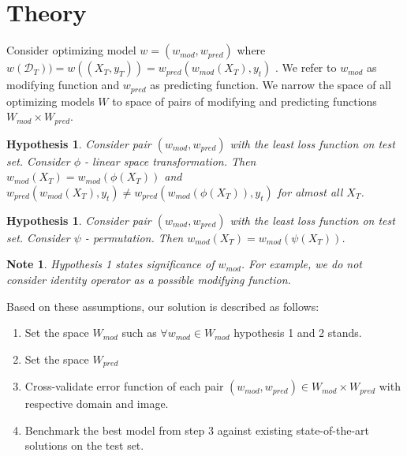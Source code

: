 \section{Theory}
Consider optimizing model $w = (w_{mod}, w_{pred})$ where $w(\mathcal{D}_T)) = w((X_T, y_T)) = w_{pred}(w_{mod}(X_T), y_t)$
. We refer to $w_{mod}$ as modifying function and $w_{pred}$ as predicting function. 
We narrow the space of all optimizing models $W$ to space of pairs of modifying and predicting functions $W_{mod} \times W_{pred}$.
\newtheorem{hypothesis}{Hypothesis}
\begin{hypothesis}
Consider pair $(w_{mod}, w_{pred})$ with the least loss function on test set. Consider $\phi$ - linear space transformation. Then $w_{mod}(X_T) = w_{mod}(\phi(X_T))$ and $w_{pred}(w_{mod}(X_T), y_t) \neq w_{pred}(w_{mod}(\phi(X_T)), y_t)$ for almost all $X_T$.
\end{hypothesis}

\newtheorem{hypothesis}{Hypothesis}
\begin{hypothesis}
Consider pair $(w_{mod}, w_{pred})$ with the least loss function on test set. Consider $\psi$ - permutation. Then $w_{mod}(X_T) = w_{mod}(\psi(X_T))$.
\end{hypothesis}

\newtheorem{note}{Note}
\begin{note}
Hypothesis 1 states significance of $w_{mod}$. For example, we do not consider identity operator as a possible modifying function.
\end{note}

Based on these assumptions, our solution is described as follows:
\begin{enumerate}
    \item Set the space $W_{mod}$ such as $\forall w_{mod} \in W_{mod}$ hypothesis 1 and 2 stands.
    \item Set the space $W_{pred}$
    \item Cross-validate error function of each pair $(w_{mod}, w_{pred}) \in W_{mod} \times W_{pred}$ with respective domain and image.
    \item Benchmark the best model from step 3 against existing state-of-the-art solutions on the test set.  
\end{enumerate}